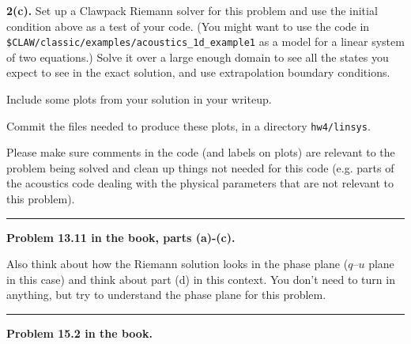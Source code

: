\documentclass[11pt]{article}
\begin{document}
{\bf 2(c).} Set up a Clawpack Riemann solver for this problem and use the
initial condition above as a test of your code.  
(You might want to use the code in
\verb+$CLAW/classic/examples/acoustics_1d_example1+ as a model for a linear 
system of two equations.)
Solve it over a large
enough domain to see all the states you expect to see in the exact solution,
and use extrapolation boundary conditions.   

Include some plots from your solution in your writeup.

Commit the files needed to produce these plots, in a directory
\verb+hw4/linsys+.

Please make sure comments in the code (and labels on plots) 
are relevant to the problem being solved and clean up things not needed for
this code (e.g. parts of the acoustics code dealing with the physical
parameters that are not relevant to this problem).




\vskip 1cm
\hrule
{\bf Problem 13.11 in the book, parts (a)-(c).}

Also think about how the Riemann solution looks in the phase plane ($q$--$u$
plane in this case) and think
about part (d) in this context.  You don't need to turn in anything, but try
to understand the phase plane for this problem.





\vskip 1cm
\hrule
{\bf Problem 15.2 in the book.}



\end{document}
